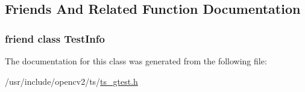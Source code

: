 \subsection{Friends And Related Function Documentation}
\hypertarget{classtesting_1_1Test_a4c49c2cdb6c328e6b709b4542f23de3c}{
\subsubsection[{Test\-Info}]{\setlength{\rightskip}{0pt plus 5cm}friend class {\bf Test\-Info}\hspace{0.3cm}{\ttfamily [friend]}}}\label{classtesting_1_1Test_a4c49c2cdb6c328e6b709b4542f23de3c}


The documentation for this class was generated from the following file\-:\begin{DoxyCompactItemize}
\item 
/usr/include/opencv2/ts/\hyperlink{ts__gtest_8h}{ts\-\_\-gtest.\-h}\end{DoxyCompactItemize}
